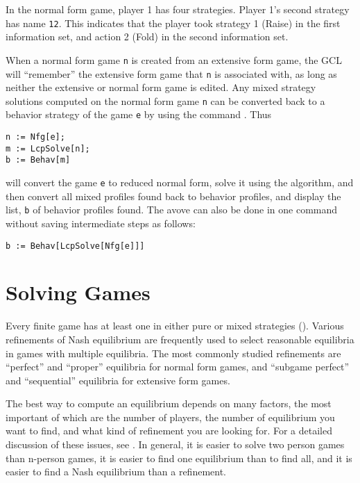 In the normal form game, player 1 has four strategies.  Player 1's
second strategy has name \verb+12+.  This indicates that the player
took strategy 1 (Raise) in the first information set, and action 2
(Fold) in the second information set.  

When a normal form game \verb+n+ is created from an extensive form
game, the GCL will ``remember'' the extensive form game that \verb+n+
is associated with, as long as neither the extensive or normal form
game is edited.  Any mixed strategy solutions computed on the normal
form game \verb+n+ can be converted back to a behavior strategy of the
game \verb+e+ by using the command .  Thus

\begin{verbatim}
n := Nfg[e];
m := LcpSolve[n];
b := Behav[m]
\end{verbatim}

\noindent
will convert the game \verb+e+ to reduced normal form, solve it using
the  algorithm, and then convert all mixed profiles found back
to behavior profiles, and display the list, \verb+b+ of behavior
profiles found. The avove can also be done in one command without saving
intermediate steps as follows:  
  
\begin{verbatim}
b := Behav[LcpSolve[Nfg[e]]]
\end{verbatim}

\chapter{Solving Games}

Every finite game has at least one  in either pure or mixed
strategies (\cite{Nash:1950}).  Various refinements of Nash
equilibrium are frequently used to select reasonable equilibria in
games with multiple equilibria.  The most commonly studied refinements
are ``perfect'' and ``proper'' equilibria for normal form games, and
``subgame perfect'' and ``sequential'' equilibria for extensive form
games.  

The best way to compute an equilibrium depends on many factors, the
most important of which are the number of players, the number of
equilibrium you want to find, and what kind of refinement you are
looking for.  For a detailed discussion of these issues, see
\cite{McKMcL:1996}.  In general, it is easier to solve two person
games than n-person games, it is easier to find one equilibrium than
to find all, and it is easier to find a Nash equilibrium than a
refinement.

